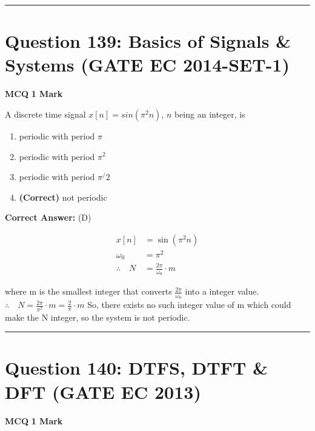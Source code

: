 \documentclass[11pt,a4paper]{article}
\begin{document}
\vspace{1.5em}
\hrule
\vspace{1.5em}

\section*{Question 139: Basics of Signals \& Systems (GATE EC 2014-SET-1)}
\noindent \textbf{\color{primary}MCQ} \hfill \textbf{\color{secondary}1 Mark}


\noindent A discrete time signal $x[n]=sin(\pi ^{2 }n)$, $n$ being an integer, is


\begin{enumerate}[label=(\Alph*)]
    \item periodic with period $\pi$
    \item periodic with period $\pi ^{2}$
    \item periodic with period $\pi ^/2$
    \item \textbf{(Correct)} not periodic
\end{enumerate}

\noindent \textbf{Correct Answer:} (D)

\begin{tcolorbox}[solbox, title=Detailed Solution -- Question 139]
\[
\begin{aligned} x[n] &=\sin \left(\pi^{2} n\right) \\ \omega_{0} &=\pi^{2} \\ \therefore \quad N &=\frac{2 \pi}{\omega_{0}} \cdot m \end{aligned}
\]

 where m is the smallest integer that converts $\frac{2 \pi}{\omega_{0}}$ into a integer value. 
$\therefore \quad N=\frac{2 \pi}{\pi^{2}} \cdot m=\frac{2}{\pi} \cdot m$
 So, there exists no such integer value of m which could make the N integer, so the system is not periodic.
\end{tcolorbox}

\vspace{1.5em}
\hrule
\vspace{1.5em}

\section*{Question 140: DTFS, DTFT \& DFT (GATE EC 2013)}
\noindent \textbf{\color{primary}MCQ} \hfill \textbf{\color{secondary}1 Mark}
\end{document}
